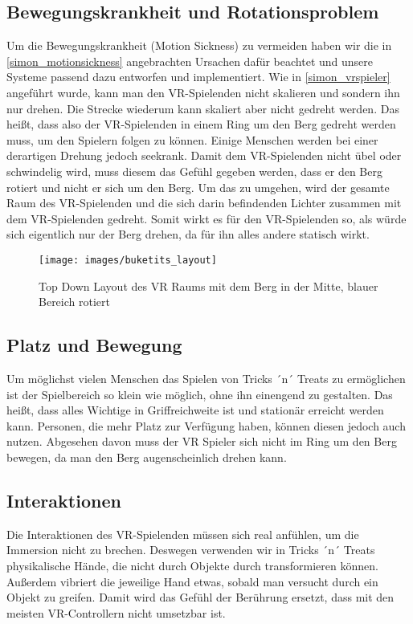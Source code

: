 \subsection{Bewegungskrankheit und Rotationsproblem}
Um die Bewegungskrankheit (Motion Sickness) zu vermeiden haben wir die in \ref{simon_motionsickness} angebrachten Ursachen dafür beachtet und unsere Systeme passend dazu entworfen und implementiert.
Wie in \ref{simon_vrspieler} angeführt wurde, kann man den VR-Spielenden nicht skalieren und sondern ihn nur drehen. Die Strecke wiederum kann skaliert aber nicht gedreht werden. Das heißt, dass also der VR-Spielenden in einem Ring um den Berg gedreht werden muss, um den Spielern folgen zu können. Einige Menschen werden bei einer derartigen Drehung jedoch seekrank. Damit dem VR-Spielenden nicht übel oder schwindelig wird, muss diesem das Gefühl gegeben werden, dass er den Berg rotiert und nicht er sich um den Berg. Um das zu umgehen, wird der gesamte Raum des VR-Spielenden und die sich darin befindenden Lichter zusammen mit dem VR-Spielenden gedreht. Somit wirkt es für den VR-Spielenden so, als würde sich eigentlich nur der Berg drehen, da für ihn alles andere statisch wirkt.


\begin{figure}[h]
	\centering
	\texttt{[image: images/buketits\_layout]}
	\caption{Top Down Layout des VR Raums mit dem Berg in der Mitte, blauer Bereich rotiert}
\end{figure}



\subsection{Platz und Bewegung}
Um möglichst vielen Menschen das Spielen von Tricks ´n´ Treats zu ermöglichen ist der Spielbereich so klein wie möglich, ohne ihn einengend zu gestalten. Das heißt, dass alles Wichtige in Griffreichweite ist und stationär erreicht werden kann. Personen, die mehr Platz zur Verfügung haben, können diesen jedoch auch nutzen. Abgesehen davon muss der VR Spieler sich nicht im Ring um den Berg bewegen, da man den Berg augenscheinlich drehen kann.

\subsection{Interaktionen}
Die Interaktionen des VR-Spielenden müssen sich real anfühlen, um die Immersion nicht zu brechen. Deswegen verwenden wir in Tricks ´n´ Treats physikalische Hände, die nicht durch Objekte durch transformieren können. Außerdem vibriert die jeweilige Hand etwas, sobald man versucht durch ein Objekt zu greifen. Damit wird das Gefühl der Berührung ersetzt, dass mit den meisten VR-Controllern nicht umsetzbar ist.

